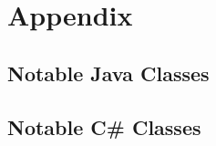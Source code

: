\chapter{Appendix} \label{App:AppendixA}
\renewcommand{\figurename}{Listing}

\section{Notable Java Classes}

				
				


\newpage
\section{Notable C\# Classes}
		